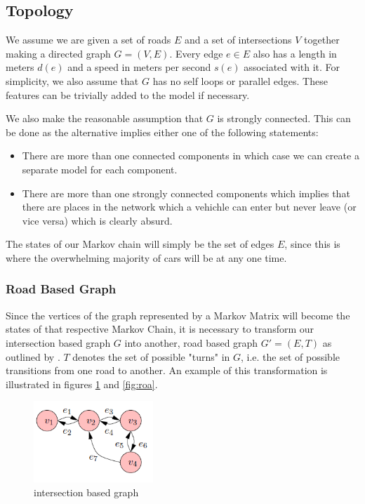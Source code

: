 \documentclass[a4paper]{article}
\begin{document}
\subsection{Topology}
We assume we are given a set of roads $E$ and a set of intersections $V$ together making a directed graph $G = (V, E)$.
Every edge $e \in E$ also has a length in meters $d(e)$ and a speed in meters per second $s(e)$ associated with it.
For simplicity, we also assume that $G$ has no self loops or parallel edges. These features can be trivially added to the model if necessary.

We also make the reasonable assumption that $G$ is strongly connected.
This can be done as the alternative implies either one of the following statements:
\begin{itemize}
	\item There are more than one connected components in which case we can create a separate model for each component.
	\item There are more than one strongly connected components which implies that there are places in the network which 
		a vehichle can enter but never leave (or vice versa) which is clearly absurd.
\end{itemize}

The states of our Markov chain will simply be the set of edges $E$, since this is where the overwhelming majority of cars will be at any one time.

\subsubsection{Road Based Graph}
Since the vertices of the graph represented by a Markov Matrix will become the states of that respective Markov Chain, it is necessary to 
transform our intersection based graph $G$ into another, road based graph $G' = (E, T)$ as outlined by \cite{volk}. 
$T$ denotes the set of possible "turns" in $G$, i.e. the set of possible transitions from one road to another.
An example of this transformation is illustrated in figures \ref{fig:int} and \ref{fig:roa}.

\begin{figure}[h]
    \centering
    \includegraphics[width=0.4\textwidth]{intersection.PNG}
    \caption{intersection based graph}
    \label{fig:int}
\end{figure}
\end{document}
